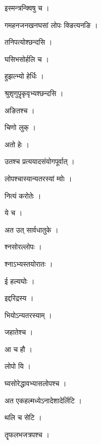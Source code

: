 \documentclass[10pt, openany]{book}
\begin{document}
\noindent इस्मन्त्रन्क्विषु च ।

\noindent गमहनजनखनघसां लोपः क्ङित्यनङि ।

\noindent तनिपत्योश्छन्दसि ।

\noindent घसिभसोर्हलि च ।

\noindent हुझल्भ्यो हेर्धिः ।

\noindent श्रुश‍ृणुपॄकृवृभ्यश्छन्दसि ।

\noindent अङितश्च ।

\noindent चिणो लुक् ।

\noindent अतो हेः ।

\noindent उतश्च प्रत्ययादसंयोगपूर्वात् ।

\noindent लोपश्चास्यान्यतरस्यां म्वोः ।

\noindent नित्यं करोतेः ।

\noindent ये च ।

\noindent अत उत् सार्वधातुके ।

\noindent श्नसोरल्लोपः ।

\noindent श्नाऽभ्यस्तयोरातः ।

\noindent ई हल्यघोः ।

\noindent इद्दरिद्रस्य ।

\noindent भियोऽन्यतरस्याम् ।

\noindent जहातेश्च ।

\noindent आ च हौ ।

\noindent लोपो यि ।

\noindent घ्वसोरेद्धावभ्यासलोपश्च ।

\noindent अत एकहल्मध्येऽनादेशादेर्लिटि ।

\noindent थलि च सेटि ।

\noindent तॄफलभजत्रपश्च ।
\end{document}

